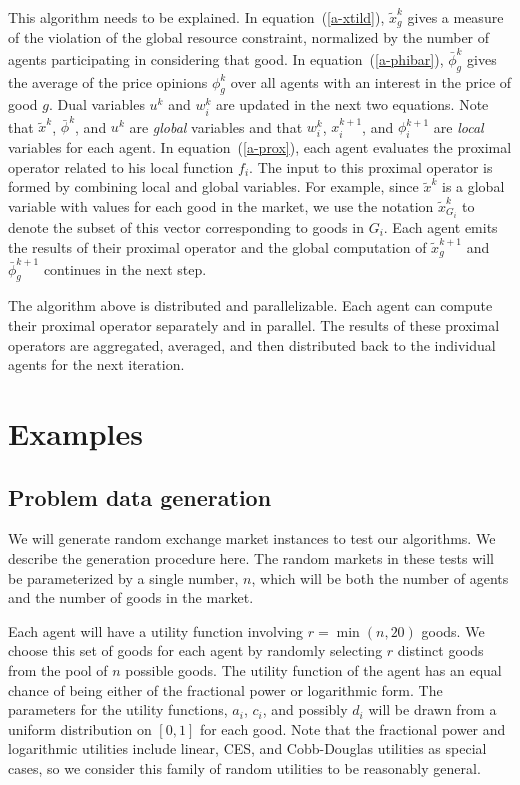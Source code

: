 \documentclass[12pt]{article}
\begin{document}
This algorithm needs to be explained.
In equation~(\ref{a-xtild}), $\tilde{x}^k_g$ gives a measure of the violation of
the global resource constraint, normalized by the number of agents participating
in considering that good.
In equation~(\ref{a-phibar}), $\bar{\phi}^k_g$ gives the average of the price
opinions $\phi^k_g$ over all agents with an interest in the price of good $g$.
Dual variables $u^k$ and $w^k_i$ are updated in the next two equations.
Note that $\tilde{x}^k$, $\bar{\phi}^k$, and $u^k$ are \emph{global} variables
and that $w_i^k$, $x_i^{k+1}$, and $\phi_i^{k+1}$ are \emph{local} variables
for each agent.
In equation~(\ref{a-prox}), each agent evaluates the proximal operator
related to his local function $f_i$.
The input to this proximal operator is formed by combining
local and global variables.
For example, since $\tilde{x}^k$ is a global variable with values for each good in the market, we use the notation $\tilde{x}^k_{G_i}$ to denote the subset of this vector corresponding to goods in $G_i$.
Each agent emits the results of their proximal operator and the
global computation of $\tilde{x}^{k+1}_g$ and $\bar{\phi}^{k+1}_g$ continues in the next step.

The algorithm above is distributed and parallelizable.
Each agent can compute their proximal operator separately and in parallel.
The results of these proximal operators are aggregated, averaged, and then distributed
back to the individual agents for the next iteration.


\section{Examples}
\label{sec:examples}
\subsection{Problem data generation}
\label{sec:random_prob}
We will generate random exchange market instances to test our algorithms.
We describe the generation procedure here.
The random markets in these tests will be parameterized
by a single number, $n$, which will be both the
number of agents and the number of goods in the market.

Each agent will have a utility function involving $r = \min(n,20)$
goods.
We choose this set of goods for each agent by randomly selecting
$r$ distinct goods from the pool of $n$ possible goods.
The utility function of the agent has an equal chance of 
being either of the fractional power or logarithmic form.
The parameters for the utility functions, $a_i$, $c_i$, and possibly
$d_i$ will be drawn from a uniform distribution on $[0,1]$ for each good.
Note that the fractional power and logarithmic utilities include
linear, CES, and Cobb-Douglas utilities as special cases,
so we consider this family of random utilities to be reasonably general.
\end{document}
